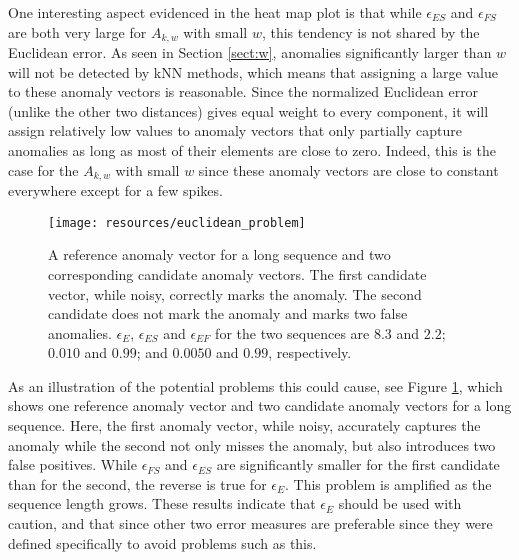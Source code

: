 One interesting aspect evidenced in the heat map plot is that while $\epsilon_{ES}$ and $\epsilon_{FS}$ are both very large for $A_{k,w}$ with small $w$, this tendency is not shared by the Euclidean error. As seen in Section \ref{sect:w}, anomalies significantly larger than $w$ will not be detected by kNN methods, which means that assigning a large value to these anomaly vectors is reasonable. Since the normalized Euclidean error (unlike the other two distances) gives equal weight to every component, it will assign relatively low values to anomaly vectors that only partially capture anomalies as long as most of their elements are close to zero.  Indeed, this is the case for the $A_{k,w}$ with small $w$ since these anomaly vectors are close to constant everywhere except for a few spikes.

\begin{figure}[ht]
    \vspace{-5pt}
    \begin{center}
        \texttt{[image: resources/euclidean\_problem]}
    \end{center}
    \vspace{-20pt}
    \caption{\small{A reference anomaly vector for a long sequence and two corresponding candidate anomaly vectors. The first candidate vector, while noisy, correctly marks the anomaly. The second candidate does not mark the anomaly and marks two false anomalies. $\epsilon_{E}$, $\epsilon_{ES}$ and $\epsilon_{EF}$ for the two sequences are $8.3$ and $2.2$; $0.010$ and $0.99$; and $0.0050$ and $0.99$, respectively.}}
    \label{fig:euclidean_problem}
    \vspace{-10pt}
\end{figure}

As an illustration of the potential problems this could cause, see Figure \ref{fig:euclidean_problem}, which shows one reference anomaly vector and two candidate anomaly vectors for a long sequence. Here, the first anomaly vector, while noisy, accurately captures the anomaly while the second not only misses the anomaly, but also introduces two false positives. While $\epsilon_{FS}$ and $\epsilon_{ES}$ are significantly smaller for the first candidate than for the second, the reverse is true for $\epsilon_E$. This problem is amplified as the sequence length grows. These results indicate that $\epsilon_E$ should be used with caution, and that since other two error measures are preferable since they were defined specifically to avoid problems such as this.

